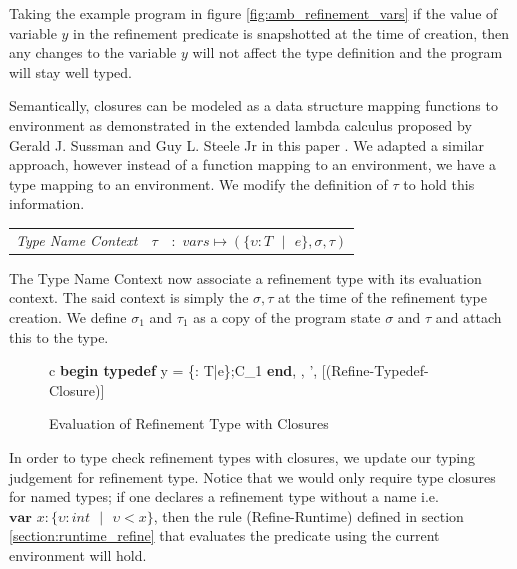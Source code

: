\documentclass[a4paper,12pt]{report}
\begin{document}
\par
Taking the example program in figure \ref{fig:amb_refinement_vars} if the 
value of variable $y$ in the refinement predicate is snapshotted at the time of 
creation, then any changes to the variable $y$ will not 
affect the type definition and the program will stay well typed.

\par
Semantically, closures can be modeled as a data structure mapping 
functions to environment as demonstrated in the extended lambda calculus proposed by 
Gerald J. Sussman and Guy L. Steele Jr in this paper \cite{closureLambdaOp}. We 
adapted a similar approach, however instead of a function mapping to an 
environment, we have a type mapping to an environment. We modify the 
definition of $\tau$ to hold this information.

\begin{center}
   \begin{tabular} {c c c}
     \textit{Type Name Context} & $\tau$& $:$ 
     $vars \mapsto (\{\upsilon : T\text{ }|\text{ }e\}, \sigma, \tau)$ \\
   \end{tabular}
\end{center}

The Type Name Context now associate a refinement type with its 
evaluation context. The said context is simply the $\sigma, \tau$ at the time of 
the refinement type creation. 
We define $\sigma_1$ and $\tau_1$ as a copy of the program state $\sigma$ and 
$\tau$ and attach this to the type. 

\begin{figure}[H]
  \begin{center}
    \begin{tabular} {c}
      {\langle\textbf{begin typedef } y = \{\upsilon : T\text{ }|\text{ }e\};C_1\textbf{ end}, 
      \sigma, \tau \rangle \longrightarrow \langle \sigma', \tau \rangle} [(Refine-Typedef-Closure)]
    \end{tabular}
  \end{center}
  \caption{Evaluation of Refinement Type with Closures}
\end{figure}

\par
In order to type check refinement types with closures, we update our typing 
judgement for refinement type. Notice that we would only require type 
closures for named types; if one declares a refinement type without a name i.e.  
$\textbf{var }x : \{\upsilon : int\text{ }|\text{ }\upsilon < x\}$, then the rule 
(Refine-Runtime) defined in section \ref{section:runtime_refine} that evaluates 
the predicate using the current environment will hold. 
\end{document}

